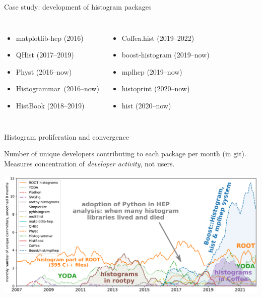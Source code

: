 \documentclass[aspectratio=169]{beamer}
\begin{document}
\begin{frame}{Case study: development of histogram packages}
\begin{uncoverenv}
\begin{columns}
\begin{itemize}
\item matplotlib-hep (2016)
\item QHist (2017--2019)
\item Physt (2016--now)
\item \mbox{Histogrammar (2016--now)\hspace{-0.2 cm}}
\item HistBook (2018--2019)
\end{itemize}

\begin{itemize}
\item Coffea.hist (2019--2022)
\item boost-histogram (2019--now)
\item mplhep (2019--now)
\item histoprint (2020--now)
\item hist (2020--now)
\end{itemize}

\end{columns}
\end{uncoverenv}
\end{frame}

\begin{frame}{Histogram proliferation and convergence}
\large
\vspace{0.25 cm}

Number of unique developers contributing to each package per month (in git). Measures concentration of {\it developer activity}, not users.

\vspace{0.1 cm}
\includegraphics[width=\linewidth]{PLOTS/github-histogram-libraries.pdf}
\end{frame}
\end{document}
